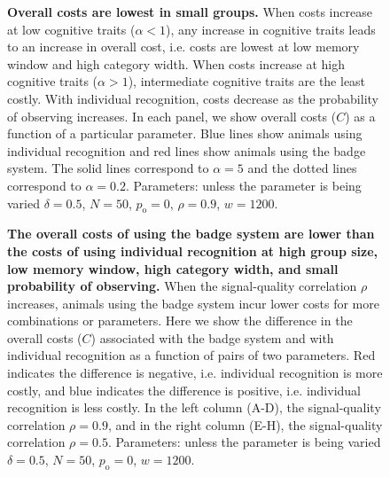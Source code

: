 \begin{figure}
\caption{\sffamily\small\textbf{Overall costs are lowest in small groups.} When costs increase at low cognitive traits ($\alpha<1$), any increase in cognitive traits leads to an increase in overall cost, i.e. costs are lowest at low memory window and high category width. When costs increase at high cognitive traits ($\alpha>1$), intermediate cognitive traits are the least costly.  With individual recognition, costs decrease as the probability of observing increases. In each panel, we show overall costs ($C$) as a function of a particular parameter. Blue lines show animals using individual recognition and red lines show animals using the badge system. The solid lines correspond to $\alpha=5$ and the dotted lines correspond to $\alpha=0.2$.  Parameters: unless the parameter is being varied $\delta = 0.5$, $N=50$, $p_\text{o}=0$, $\rho=0.9$, $w=1200$.}
\label{costs}
\end{figure}

\begin{figure}
\caption{\sffamily\small\textbf{The overall costs of using the badge system are lower than the costs of using individual recognition at high group size, low memory window, high category width, and small probability of observing.} When the signal-quality correlation $\rho$ increases, animals using the badge system incur lower costs for more combinations or parameters. Here we show the difference in the overall costs ($C$) associated with the badge system and with individual recognition as a function of pairs of two parameters. Red indicates the difference is negative, i.e. individual recognition is more costly, and blue indicates the difference is positive, i.e. individual recognition is less costly.  In the left column (A-D), the signal-quality correlation $\rho=0.9$, and in the right column (E-H), the signal-quality correlation $\rho=0.5$. Parameters: unless the parameter is being varied $\delta = 0.5$, $N=50$, $p_\text{o}=0$, $w=1200$.}
\label{comparison}
\end{figure}

